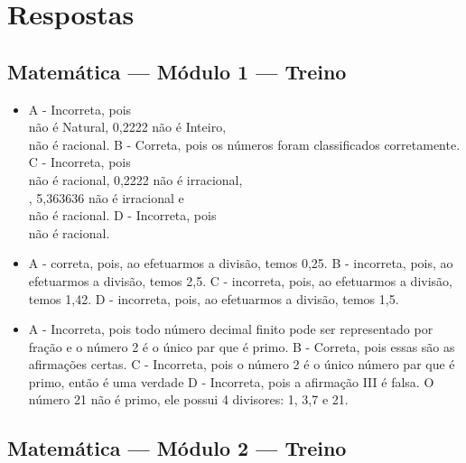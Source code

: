 
\chapter{Respostas}

\footnotesize

\pagecolor{gray!40}

\section*{Matemática — Módulo 1 — Treino}

\begin{itemize}
\item A - Incorreta, pois \\ não é Natural, 0,2222 não é Inteiro,
\\ não é racional.
B - Correta, pois os números foram classificados corretamente.
C - Incorreta, pois \\ não é racional, 0,2222 não é
irracional, \\ , 5,363636 não é irracional e \\
não é racional.
D - Incorreta, pois \\ não é racional.
\item A - correta, pois, ao efetuarmos a divisão, temos 0,25.
B - incorreta, pois, ao efetuarmos a divisão, temos 2,5.
C - incorreta, pois, ao efetuarmos a divisão, temos 1,42.
D - incorreta, pois, ao efetuarmos a divisão, temos 1,5.
\item A - Incorreta, pois todo número decimal finito pode ser representado por
fração e o número 2 é o único par que é primo.
B - Correta, pois essas são as afirmações certas.
C - Incorreta, pois o número 2 é o único número par que é primo, então é
uma verdade
D - Incorreta, pois a afirmação III é falsa. O número 21 não é primo,
ele possui 4 divisores: 1, 3,7 e 21.
\end{itemize}

\section*{Matemática — Módulo 2 — Treino}

